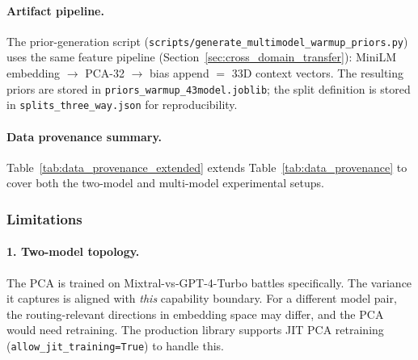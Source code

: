 \paragraph{Artifact pipeline.}
The prior-generation script
(\texttt{scripts/generate\_multimodel\_warmup\_priors.py}) uses the same
feature pipeline (Section~\ref{sec:cross_domain_transfer}): MiniLM embedding
$\to$ PCA-32 $\to$ bias append $=$ 33D context vectors.  The resulting
priors are stored in \texttt{priors\_warmup\_43model.joblib}; the split
definition is stored in \texttt{splits\_three\_way.json} for reproducibility.

\paragraph{Data provenance summary.}
Table~\ref{tab:data_provenance_extended} extends
Table~\ref{tab:data_provenance} to cover both the two-model and multi-model
experimental setups.

\begin{table}[h]
\centering
\caption{Extended data provenance covering two-model and multi-model experiments.}
\label{tab:data_provenance_extended}
\small
{}
\end{table}

\subsubsection{Limitations}
\label{sec:transfer_limitations}

\paragraph{1. Two-model topology.}
The PCA is trained on Mixtral-vs-GPT-4-Turbo battles specifically.  The
variance it captures is aligned with \emph{this} capability boundary.  For a
different model pair, the routing-relevant directions in embedding space may
differ, and the PCA would need retraining.  The production library supports
JIT PCA retraining (\texttt{allow\_jit\_training=True}) to handle this.

